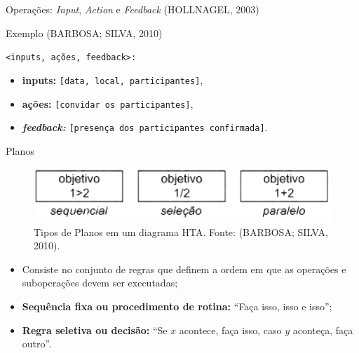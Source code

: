\documentclass[xcolor=dvipsnames]{beamer}
\let\olditem=\item%
\renewcommand{\item}{\olditem \justifying}%
\begin{document}
\begin{frame}{Operações: \textit{Input}, \textit{Action} e \textit{Feedback}  (HOLLNAGEL, 2003)}

	\begin{block}{Exemplo (BARBOSA; SILVA, 2010)}
        
        \bigskip
        
		\texttt{\textless inputs, ações, feedback\textgreater:}
        
        \bigskip
        
        \begin{itemize}

			\item \textbf{inputs:} \texttt{[data, local, participantes]},
            \item \textbf{ações:} \texttt{[convidar os participantes]}, 
            \item \textbf{\textit{feedback:}} \texttt{[presença dos participantes confirmada]}.

		\end{itemize}
        
		
	\end{block}
    
\end{frame}


\begin{frame}{Planos}

  	\begin{figure}[H]

    	\centering
        \label{fig:taskarchitect}
        \includegraphics[width=0.75\linewidth]{img/planos.png}
        \caption{Tipos de Planos em um diagrama HTA. Fonte: (BARBOSA; SILVA, 2010).}

    \end{figure}

	\begin{itemize}
    
		\item Consiste no conjunto de regras que definem a ordem em que as operações e suboperações devem ser executadas;
        
        \bigskip
        
        
		\item \textbf{Sequência fixa ou procedimento de rotina:} ``Faça isso, isso e isso'';
        
        \bigskip
        
		\item \textbf{Regra seletiva ou decisão:} ``Se $x$ acontece, faça isso, caso $y$ aconteça, faça outro''.
            
	\end{itemize}
    
\end{frame}
\end{document}
